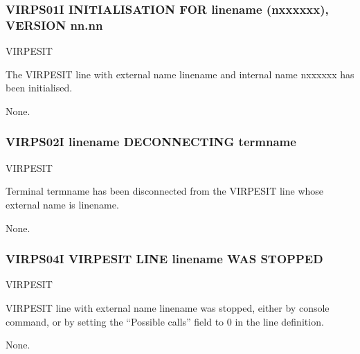 \documentclass[letterpaper,10pt,english]{sphinxmanual}
\begin{document}
\subsubsection{VIRPS01I INITIALISATION FOR linename (n\sphinxhyphen{}xxxxxx), VERSION nn.nn}
\label{\detokenize{messages:virps01i-initialisation-for-linename-n-xxxxxx-version-nn-nn}}\begin{description}
\sphinxAtStartPar
VIRPESIT

\sphinxAtStartPar
The VIRPESIT line with external name linename and internal name n\sphinxhyphen{}xxxxxx has been initialised.

\sphinxAtStartPar
None.

\end{description}


\subsubsection{VIRPS02I linename DECONNECTING termname}
\label{\detokenize{messages:virps02i-linename-deconnecting-termname}}\begin{description}
\sphinxAtStartPar
VIRPESIT

\sphinxAtStartPar
Terminal termname has been disconnected from the VIRPESIT line whose external name is linename.

\sphinxAtStartPar
None.

\end{description}


\subsubsection{VIRPS04I VIRPESIT LINE linename WAS STOPPED}
\label{\detokenize{messages:virps04i-virpesit-line-linename-was-stopped}}\begin{description}
\sphinxAtStartPar
VIRPESIT

\sphinxAtStartPar
VIRPESIT line with external name linename was stopped, either by console command, or by setting the “Possible calls” field to 0 in the line definition.

\sphinxAtStartPar
None.

\end{description}
\end{document}
